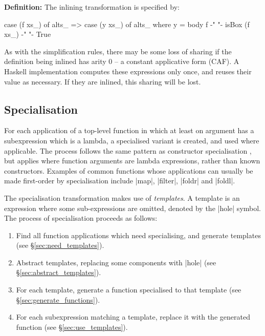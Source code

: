 \documentclass[preprint]{sigplanconf}
\newenvironment{definition}
    {\smallskip
     \noindent\textbf{Definition:}}
    {\noexample}
\begin{document}
\begin{definition}
The inlining transformation is specified by:

\ignore\begin{code}
case (f xs_) of alts_
    => case (y xs_) of alts_
    where
        y = body f
        {-"  "-} isBox (f xs_) {-"  "-} True
\end{code}\codeexample
\end{definition}\bigskip

As with the simplification rules, there may be some loss of sharing if the definition being inlined has arity 0 -- a constant applicative form (CAF). A Haskell implementation computes these expressions only once, and reuses their value as necessary. If they are inlined, this sharing will be lost.

\subsection{Specialisation}

For each application of a top-level function in which at least on argument has a subexpression which is a lambda, a specialised variant is created, and used where applicable. The process follows the same pattern as constructor specialisation \cite{spj:specconstr}, but applies where function arguments are lambda expressions, rather than known constructors. Examples of common functions whose applications can usually be made first-order by specialisation include |map|, |filter|, |foldr| and |foldl|.

The specialisation transformation makes use of \textit{templates}. A template is an expression where some sub-expressions are omitted, denoted by the |hole| symbol. The process of specialisation proceeds as follows:

\begin{enumerate}
\item Find all function applications which need specialising, and generate templates (see \S\ref{sec:need_templates}).
\item Abstract templates, replacing some components with |hole| (see \S\ref{sec:abstract_templates}).
\item For each template, generate a function specialised to that template (see \S\ref{sec:generate_functions}).
\item For each subexpression matching a template, replace it with the generated function (see \S\ref{sec:use_templates}).
\end{enumerate}
\end{document}
